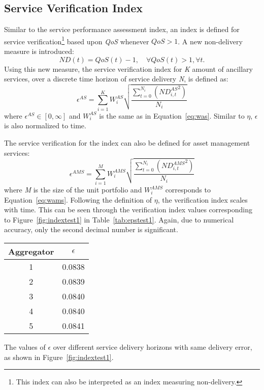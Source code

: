 
\subsection{Service Verification Index}
Similar to the service performance assessment index, an index is defined for service verification\footnote{This index can also be interpreted as an index measuring non-delivery.} based upon \emph{QoS} whenever $QoS > 1$. A new non-delivery measure is introduced:
\begin{equation}
	ND(t) = QoS(t) - 1,\quad \forall QoS(t) > 1, \forall t.
\end{equation}
Using this new measure, the service verification index for \emph{K} amount of ancillary services, over a discrete time horizon of service delivery \emph{N}, is defined as:
\begin{equation}\label{eq:epsilonASmain}
	\epsilon^{AS} = \sum^{K}_{i=1} W^{AS}_i \sqrt{\frac{\sum^{N_i}_{t=0} \left( {ND^{AS}_{i,t}}^{2} \right)}{N_i}}
\end{equation}
where $\epsilon^{AS} \in [0,\infty]$ and $W^{AS}_i$ is the same as in Equation~\eqref{eq:was}. Similar to $\eta$, $\epsilon$ is also normalized to time.

The service verification for the index can also be defined for asset management services:
\begin{equation}\label{eq:epsilonAMSmain}
	\epsilon^{AMS} = \sum^{M}_{i=1} W^{AMS}_i \sqrt{\frac{\sum^{N_i}_{t=0} \left( {ND^{AMS}_{i,t}}^{2} \right)}{N_i}}
\end{equation}
where  \emph{M} is the size of the unit portfolio and $W^{AMS}_i$ corresponds to Equation~\eqref{eq:wams}. Following the definition of $\eta$, the verification index scales with time. This can be seen through the verification index values corresponding to Figure~\ref{fig:indextest1} in Table~\ref{tab:epstest1}. Again, due to numerical accuracy, only the second decimal number is significant.
\begin{margintable}%
	\centering
	\begin{tabular}{cc}
		\toprule
		Aggregator & $\epsilon$ \\
		\midrule
		1 & 0.0838 \\
		2 & 0.0839  \\
		3 & 0.0840  \\
		4 & 0.0840  \\
		5 & 0.0841 \\
		\bottomrule
	\end{tabular}
	\caption{The values of $\epsilon$ over different service delivery horizons with same delivery error, as shown in Figure~\ref{fig:indextest1}.}
	\label{tab:epstest1}
\end{margintable}

